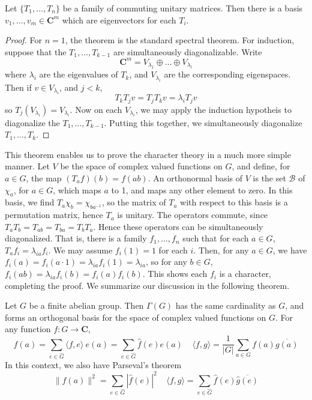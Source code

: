 \begin{theorem}
    Let $\{ T_1, \dots, T_n \}$ be a family of commuting unitary matrices. Then there is a basis $v_1, \dots, v_m \in \mathbf{C}^m$ which are eigenvectors for each $T_i$.
\end{theorem}
\begin{proof}
    For $n = 1$, the theorem is the standard spectral theorem. For induction, suppose that the $T_1, \dots, T_{k-1}$ are simultaneously diagonalizable. Write
    \[ \mathbf{C}^m = V_{\lambda_1} \oplus \dots \oplus V_{\lambda_l} \]
    where $\lambda_i$ are the eigenvalues of $T_k$, and $V_{\lambda_i}$ are the corresponding eigenspaces. Then if $v \in V_{\lambda_i}$, and $j < k$,
    \[ T_k T_j v = T_j T_k v = \lambda_i T_j v \]
    so $T_j(V_{\lambda_i}) = V_{\lambda_i}$. Now on each $V_{\lambda_i}$, we may apply the induction hypotheis to diagonalize the $T_1, \dots, T_{k-1}$. Putting this together, we simultaneously diagonalize $T_1, \dots, T_k$.
\end{proof}

This theorem enables us to prove the character theory in a much more simple manner. Let $V$ be the space of complex valued functions on $G$, and define, for $a \in G$, the map $(T_a f)(b) = f(ab)$. An orthonormal basis of $V$ is the set $\mathcal{B}$ of $\chi_a$, for $a \in G$, which maps $a$ to 1, and maps any other element to zero. In this basis, we  find $T_a \chi_b = \chi_{ba^{-1}}$, so the matrix of $T_a$ with respect to this basis is a permutation matrix, hence $T_a$ is unitary. The operators commute, since $T_a T_b = T_{ab} = T_{ba} = T_b T_a$. Hence these operators can be simultaneously diagonalized. That is, there is a family $f_1, \dots, f_n$ such that for each $a \in G$, $T_a f_i = \lambda_{ia} f_i$. We may assume $f_i(1) = 1$ for each $i$. Then, for any $a \in G$, we have $f_i(a) = f_i(a \cdot 1) = \lambda_{ia} f_i(1) = \lambda_{ia}$, so for any $b \in G$, $f_i(ab) = \lambda_{ia} f_i(b) = f_i(a) f_i(b)$. This shows each $f_i$ is a character, completing the proof. We summarize our discussion in the following theorem.

\begin{theorem}
    Let $G$ be a finite abelian group. Then $\Gamma(G)$ has the same cardinality as $G$, and forms an orthogonal basis for the space of complex valued functions on $G$. For any function $f: G \to \mathbf{C}$,
    \[ f(a) = \sum_{e \in \hat{G}} \langle f, e \rangle\ e(a) = \sum_{e \in \hat{G}} \hat{f}(e) e(a)\ \ \ \ \ \langle f, g \rangle = \frac{1}{|G|} \sum_{a \in G} f(a) \overline{g(a)} \]
    In this context, we also have Parseval's theorem
    \[ \| f(a) \|^2 = \sum_{e \in \hat{G}} |\hat{f}(e)|^2\ \ \ \ \ \langle f, g \rangle = \sum_{e \in \hat{G}} \hat{f}(e) \overline{\hat{g}(e)} \]
\end{theorem}

